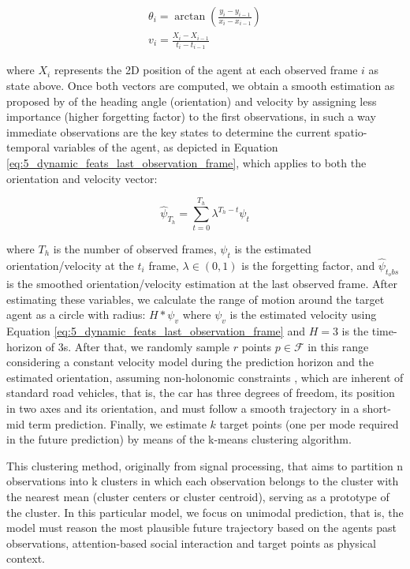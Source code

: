 \begin{equation}
	\begin{split}
		\theta_{i}=\arctan{(\frac{y_{i}-y_{i-1}}{x_{i}-x_{i-1}})} \\
		v_{i}=\frac{X_{i}-X_{i-1}}{t_{i}-t_{i-1}} 
	\end{split}
\end{equation}
 
where $X_{i}$ represents the 2D position of the agent at each observed frame $i$ as state above. Once both vectors are computed, we obtain a smooth estimation as proposed by \cite{tang2021exploring} of the heading angle (orientation) and velocity by assigning less importance (higher forgetting factor) to the first observations, in such a way immediate observations are the key states to determine the current spatio-temporal variables of the agent, as depicted in Equation \ref{eq:5_dynamic_feats_last_observation_frame}, which applies to both the orientation and velocity vector: 

\begin{equation}
	\hat{\psi}_{T_h} = \sum_{t=0}^{T_h}\lambda^{T_h - t}\psi_t
	\label{eq:5_dynamic_feats_last_observation_frame}
\end{equation}

where $T_h$ is the number of observed frames, $\psi_t$ is the estimated orientation/velocity at the $t_{i}$ frame, $\lambda\in(0, 1)$ is the forgetting factor, and $\hat{\psi}_{t_obs}$ is the smoothed orientation/velocity estimation at the last observed frame. After estimating these variables, we calculate the range of motion around the target agent as a circle with radius: $H * \psi_{v}$ where $\psi_{v}$ is the estimated velocity using Equation \ref{eq:5_dynamic_feats_last_observation_frame} and $H=3$ is the time-horizon of 3s. After that, we randomly sample $r$ points $p \in \mathcal{F}$ in this range considering a constant velocity model during the prediction horizon and the estimated orientation, assuming non-holonomic constraints \cite{triggs1993motion}, which are inherent of standard road vehicles, that is, the car has three degrees of freedom, its position in two axes and its orientation, and must follow a smooth trajectory in a short-mid term prediction. Finally, we estimate $k$ target points (one per mode required in the future prediction) by means of the k-means \cite{ahmed2020k} clustering algorithm. 

This clustering method, originally from signal processing, that aims to partition n observations into k clusters in which each observation belongs to the cluster with the nearest mean (cluster centers or cluster centroid), serving as a prototype of the cluster. In this particular model, we focus on unimodal prediction, that is, the model must reason the most plausible future trajectory based on the agents past observations, attention-based social interaction and target points as physical context.

